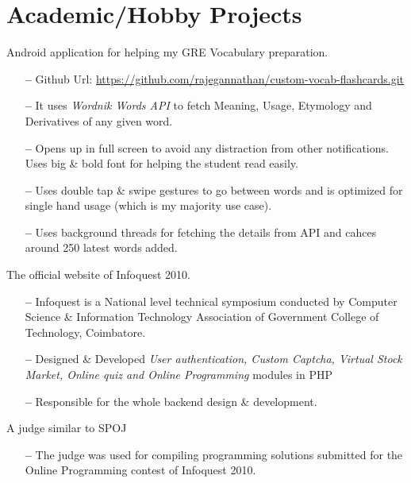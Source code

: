 \documentclass{cv}
\begin{document}
\section{Academic/Hobby Projects}
\begin{description}[leftmargin=50pt,labelwidth=50pt]
  \item[Gre Wordcards] Android application for helping my GRE Vocabulary preparation.
    \begin{itemize}[label={},leftmargin=10pt,topsep=0pt]
      \item[\textbf{--}] Github Url: \url{https://github.com/rajegannathan/custom-vocab-flashcards.git}
      \item[\textbf{--}] It uses \textit{Wordnik Words API} to fetch Meaning, Usage, Etymology and Derivatives of any given word.
      \item[\textbf{--}] Opens up in full screen to avoid any distraction from other notifications.  Uses big \& bold font for helping the student read easily.
      \item[\textbf{--}] Uses double tap \& swipe gestures to go between words and is optimized for single hand usage (which is my majority use case).
      \item[\textbf{--}] Uses background threads for fetching the details from API and cahces around 250 latest words added.
    \end{itemize}
  \item[infoquestgct.com] The official website of Infoquest 2010.  
    \begin{itemize}[label={},leftmargin=10pt,topsep=0pt]
      \item[\textbf{--}] Infoquest is a National level technical symposium conducted by Computer Science \& Information Technology Association of Government College of Technology, Coimbatore.
      \item[\textbf{--}] Designed \& Developed \textit{User authentication, Custom Captcha, Virtual Stock Market, Online quiz and Online Programming} modules in PHP\@
      \item[\textbf{--}] Responsible for the whole backend design \& development.
    \end{itemize}
  \item[Online Judge] A judge similar to SPOJ\@
    \begin{itemize}[label={},leftmargin=10pt,topsep=0pt]
      \item[\textbf{--}] The judge was used for compiling programming solutions submitted for the Online Programming contest of Infoquest 2010.

\end{itemize}
\end{description}
\end{document}
